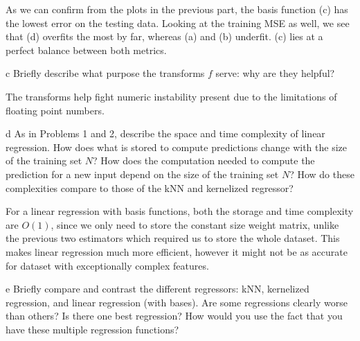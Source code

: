 \documentclass[expanded]{lkx_pset}
\begin{document}
\begin{parts}
	As we can confirm from the plots in the previous part, the basis function (c) has the lowest error on the testing data. Looking at the training MSE as well, we see that (d) overfits the most by far, whereas (a) and (b) underfit. (c) lies at a perfect balance between both metrics.

	\begin{part}{c}
		Briefly describe what purpose the transforms $f$ serve: why are they helpful?
	\end{part}

	The transforms help fight numeric instability present due to the limitations of floating point numbers.

	\begin{part}{d}
		As in Problems 1 and 2, describe the space and time complexity of linear regression.  How does what is stored to compute predictions change with the size of the training set $N$?  How does the computation needed to compute the prediction for a new input depend on the size of the training set $N$?  How do these complexities compare to those of the kNN and kernelized regressor?
	\end{part}

	For a linear regression with basis functions, both the storage and time complexity are $O(1)$, since we only need to store the constant size weight matrix, unlike the previous two estimators which required us to store the whole dataset. This makes linear regression much more efficient, however it might not be as accurate for dataset with exceptionally complex features.

	\begin{part}{e}
		Briefly compare and contrast the different regressors: kNN,
		kernelized regression, and linear regression (with bases).  Are some
		regressions clearly worse than others?  Is there one best
		regression?  How would you use the fact that you have these multiple
		regression functions?
	\end{part}


\end{parts}
\end{document}
